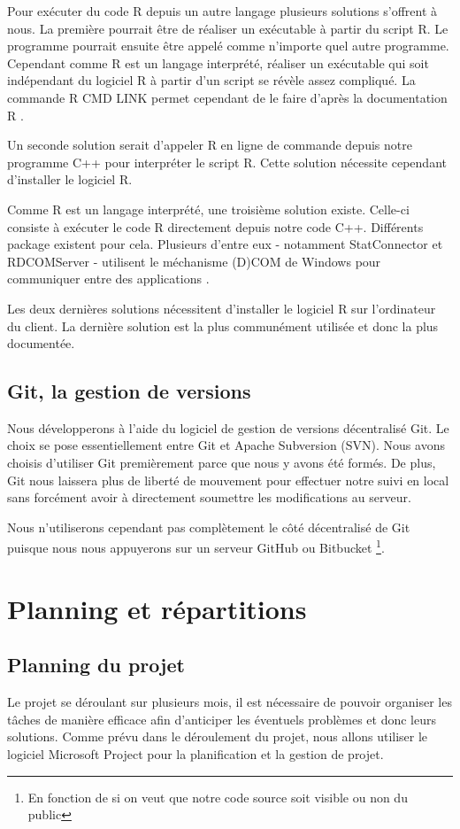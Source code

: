 	Pour exécuter du code R depuis un autre langage plusieurs solutions s'offrent à nous. La première pourrait être de réaliser un exécutable à partir du script R. Le programme pourrait ensuite être appelé comme n'importe quel autre programme. Cependant comme R est un langage interprété, réaliser un exécutable qui soit indépendant du logiciel R à partir d'un script se révèle assez compliqué. La commande R CMD LINK permet cependant de le faire d'après la documentation R \cite{website:R-LINK}.

	Un seconde solution serait d'appeler R en ligne de commande depuis notre programme C++ pour interpréter le script R. Cette solution nécessite cependant d'installer le logiciel R.

	Comme R est un langage interprété, une troisième solution existe. Celle-ci consiste à exécuter le code R directement depuis notre code C++. Différents package existent pour cela. Plusieurs d'entre eux - notamment StatConnector et RDCOMServer - utilisent le méchanisme (D)COM de Windows pour communiquer entre des applications \cite{website:R-under-Windows}.

	Les deux dernières solutions nécessitent d'installer le logiciel R sur l'ordinateur du client. La dernière solution est la plus communément utilisée et donc la plus documentée. 


\subsection{Git, la gestion de versions}
	Nous développerons à l'aide du logiciel de gestion de versions décentralisé Git. Le choix se pose essentiellement entre Git et Apache Subversion (SVN). Nous avons choisis d'utiliser Git premièrement parce que nous y avons été formés. De plus, Git nous laissera plus de liberté de mouvement pour effectuer notre suivi en local sans forcément avoir à directement soumettre les modifications au serveur.

	Nous n'utiliserons cependant pas complètement le côté décentralisé de Git puisque nous nous appuyerons sur un serveur GitHub ou Bitbucket \footnote{En fonction de si on veut que notre code source soit visible ou non du public}.


\section{Planning et répartitions}

\subsection{Planning du projet}
	Le projet se déroulant sur plusieurs mois, il est nécessaire de pouvoir organiser les tâches de manière efficace afin d'anticiper les éventuels problèmes et donc leurs solutions. Comme prévu dans le déroulement du projet, nous allons utiliser le logiciel Microsoft Project pour la planification et la gestion de projet.

